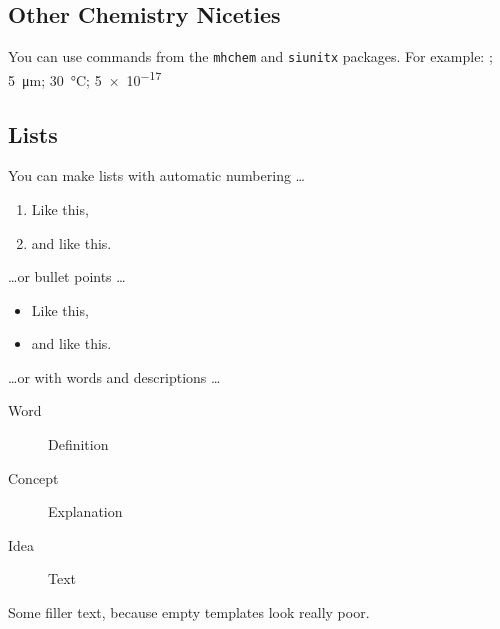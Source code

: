 \documentclass[9pt,bestpractices]{livecoms}
\begin{document}
\begin{figure}[hbt!]
\end{figure}

\subsection{Other Chemistry Niceties}

You can use commands from the \texttt{mhchem} and \texttt{siunitx} packages. For example: ; \SI{5}{\micro\metre}; \SI{30}{\degreeCelsius}; \SI{5e-17}{\Molar}

\subsection{Lists}

You can make lists with automatic numbering \dots

\begin{enumerate}
\item Like this,
\item and like this.
\end{enumerate}
\dots or bullet points \dots
\begin{itemize}
\item Like this,
\item and like this.
\end{itemize}
\dots or with words and descriptions \dots
\begin{description}
\item[Word] Definition
\item[Concept] Explanation
\item[Idea] Text
\end{description}

Some filler text, because empty templates look really poor. \lipsum[1]
\end{document}
